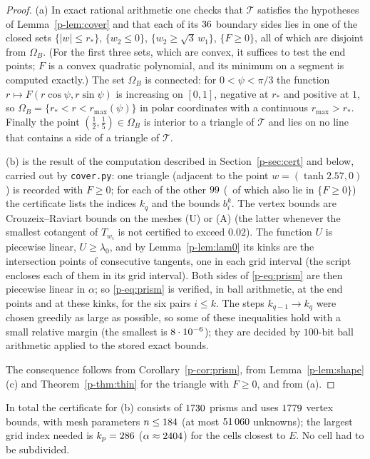 \documentclass[11pt]{article}
\theoremstyle{remark}
\begin{document}
\begin{proof}
(a) In exact rational arithmetic one checks that $\mathcal T$ satisfies the hypotheses of
Lemma~\ref{p-lem:cover} and that each of its $36$ boundary sides lies in one of the closed sets
$\{|w|\le r_*\}$, $\{w_2\le0\}$, $\{w_2\ge\sqrt3\,w_1\}$, $\{F\ge0\}$, all of which are disjoint
from $\Omega_B$. (For the first three sets, which are convex, it suffices to test the end
points; $F$ is a convex quadratic polynomial, and its minimum on a segment is computed
exactly.) The set $\Omega_B$ is connected: for $0<\psi<\pi/3$ the function
$r\mapsto F(r\cos\psi,r\sin\psi)$ is increasing on $[0,1]$, negative at $r_*$ and positive at
$1$, so $\Omega_B=\{r_*<r<r_{\max}(\psi)\}$ in polar coordinates with a continuous
$r_{\max}>r_*$. Finally the point $(\frac12,\frac15)\in\Omega_B$ is interior to a triangle of
$\mathcal T$ and lies on no line that contains a side of a triangle of $\mathcal T$.

(b) is the result of the computation described in Section~\ref{p-sec:cert} and below, carried
out by \texttt{cover.py}: one triangle (adjacent to the point $w=(\tanh2.57,0)$) is recorded
with $F\ge0$; for each of the other $99$ (\clpThinBword\ of which also lie in $\{F\ge0\}$) the
certificate lists the indices $k_q$ and the bounds $b_i^k$. The vertex bounds are Crouzeix--Raviart bounds on the meshes (U) or (A) (the latter
whenever the smallest cotangent of $T_{w_i}$ is not certified to exceed $0.02$). The function
$U$ is piecewise linear, $U\ge\lambda_0$, and by Lemma~\ref{p-lem:lam0} its kinks are the
intersection points of consecutive tangents, one in each grid interval (the script encloses
each of them in its grid interval). Both sides of \eqref{p-eq:prism} are then piecewise linear in
$\alpha$; so \eqref{p-eq:prism} is verified, in ball arithmetic, at the end points and at these
kinks, for the six pairs $i\le k$. The steps $k_{q-1}\to k_q$ were chosen greedily as large as
possible, so some of these inequalities hold with a small relative margin (the smallest is
$8\cdot10^{-6}$); they are decided by $100$-bit ball arithmetic applied to the stored exact
bounds.

The consequence follows from Corollary~\ref{p-cor:prism}, from Lemma~\ref{p-lem:shape}(c) and
Theorem~\ref{p-thm:thin} for the triangle with $F\ge0$, and from (a).
\end{proof}

In total the certificate for (b) consists of $1730$ prisms and uses $1779$ vertex
bounds, with mesh parameters $n\le184$ (at most $51\,060$ unknowns); the largest grid index
needed is $k_p=286$ ($\alpha\approx2404$) for the cells closest to $E$. No cell had to be
subdivided.
\end{document}
